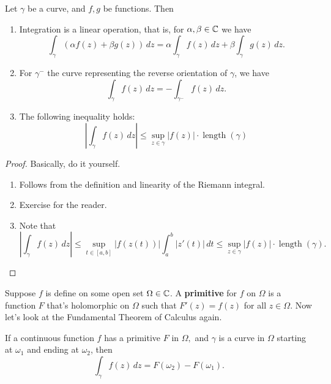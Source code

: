 \begin{prop}
    Let $\gamma$ be a curve, and $f,g$ be functions. Then
    \begin{enumerate}
        \item Integration is a linear operation, that is, for $\alpha ,\beta \in \mathbb{C}$ we have \[
                \int_{\gamma}^{} (\alpha f(z)+\beta g(z)) \, dz=\alpha \int_{\gamma}^{} f(z) \, dz+\beta \int_{\gamma}^{} g(z) \, dz.
        \] 
\item For $\gamma^-$ the curve representing the reverse orientation of $\gamma$, we have\[
        \int _{\gamma}f(z) \, dz = - \int _{\gamma^-}f(z) \, dz.
\] 
\item The following inequality holds: \[
        \left| \int_{\gamma}^{} f(z) \, dz \right| \leq \underset{z\in \gamma}{\operatorname{sup}}|f(z)|\cdot \operatorname{length}(\gamma)
\] 
    \end{enumerate}
\end{prop}
\begin{proof}
    Basically, do it yourself.
    \begin{enumerate}
        \item Follows from the definition and linearity of the Riemann integral.
        \item Exercise for the reader.
        \item Note that \[
                \left| \int_{\gamma}^{} f(z) \, dz \right| \leq \underset{t\in [a,b]}{\operatorname{sup}}|f(z(t))| \int_{a}^{b} |z'(t)| \, dt \leq \underset{z\in \gamma}{\operatorname{sup}}|f(z)|\cdot \operatorname{length}(\gamma).
        \] 
    \end{enumerate}
\end{proof}
Suppose $f$ is define on some open set $\Omega\in \mathbb{C}$. A \textbf{primitive} for $f$ on $\Omega$ is a function $F$ that's holomorphic on $\Omega$ such that $F'(z)=f(z)$ for all $z\in \Omega$. Now let's look at the Fundamental Theorem of Calculus again.
\begin{theorem}
    If a continuous function $f$ has a primitive $F$ in $\Omega, $ and $\gamma$ is a curve in $\Omega$ starting at $\omega_1$ and ending at $\omega_2$, then \[
        \int_{\gamma}^{} f(z) \, dz=F(\omega_2)-F(\omega_1).
    \] 
\end{theorem}
